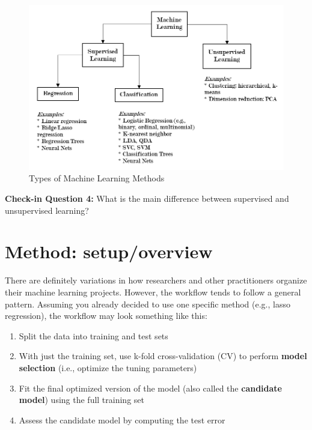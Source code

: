 \documentclass{book}
\begin{document}
\begin{figure}
\hypertarget{fig:jl-figure4}{%
\centering
\includegraphics{images/ml/jl-figure4.png}
\caption{Types of Machine Learning Methods}\label{fig:jl-figure4}
}
\end{figure}

\textbf{Check-in Question 4:} What is the main difference between supervised
and unsupervised learning?

\hypertarget{method-setupoverview-3}{%
\section{Method: setup/overview}\label{method-setupoverview-3}}

There are definitely variations in how researchers and other practitioners
organize their machine learning projects. However, the workflow tends to
follow a general pattern. Assuming you already decided to use one specific
method (e.g., lasso regression), the workflow may look something like this:

\begin{enumerate}
\def\labelenumi{\arabic{enumi}.}
\item
  Split the data into training and test sets
\item
  With just the training set, use k-fold cross-validation (CV) to perform
  \textbf{model selection} (i.e., optimize the tuning parameters)
\item
  Fit the final optimized version of the model (also called the
  \textbf{candidate model}) using the full training set
\item
  Assess the candidate model by computing the test error
\end{enumerate}
\end{document}
